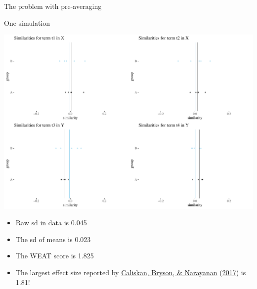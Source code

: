 \documentclass[
  10pt,
  ignorenonframetext,
  x11names, dvipsnames, bibspacing,natbib]{beamer}
\providecommand{\tightlist}{%
  \setlength{\itemsep}{0pt}\setlength{\parskip}{0pt}}
\begin{document}
\begin{frame}{The problem with pre-averaging}
\protect\hypertarget{the-problem-with-pre-averaging-1}{}
\begin{block}{One simulation}
\protect\hypertarget{one-simulation}{}
\vspace{1mm}
\footnotesize

\begin{center}\includegraphics[width=0.7\linewidth]{presentationBoston_files/figure-beamer/unnamed-chunk-6-1} \end{center}
\normalsize

\vspace{1mm}
\footnotesize

\normalsize
\pause

\footnotesize

\vspace{-2mm}

\begin{itemize}
\tightlist
\item
  Raw sd in data is 0.045
\item
  The sd of means is 0.023
\item
  The WEAT score is 1.825
\item
  The largest effect size reported by
  \protect\hyperlink{ref-Caliskan2017semanticsBiases}{Caliskan, Bryson,
  \& Narayanan}
  (\protect\hyperlink{ref-Caliskan2017semanticsBiases}{2017}) is 1.81!
\end{itemize}
\end{block}
\end{frame}
\end{document}
